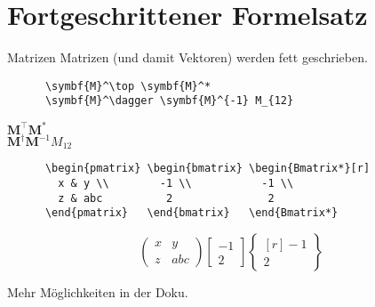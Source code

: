 \section{Fortgeschrittener Formelsatz}

\begin{frame}[fragile]{
  Matrizen
  \hfill{}
}
  Matrizen (und damit Vektoren) werden fett geschrieben.
  \begin{CodeExample}{0.70}
    \begin{lstlisting}
      \symbf{M}^\top \symbf{M}^*
      \symbf{M}^\dagger \symbf{M}^{-1} M_{12}
    \end{lstlisting}
  \CodeResult
    $\symbf{M}^\top \symbf{M}^*$ \\
    $\symbf{M}^\dagger \symbf{M}^{-1} M_{12}$
  \end{CodeExample}

  \fontsize{8}{6}
  \begin{CodeExample}{0.70}
    \begin{lstlisting}
      \begin{pmatrix} \begin{bmatrix} \begin{Bmatrix*}[r]
        x & y \\        -1 \\           -1 \\
        z & abc          2               2
      \end{pmatrix}   \end{bmatrix}   \end{Bmatrix*}
    \end{lstlisting}
  \CodeResult
    \removedisplayskip
    \begin{equation*}
      \begin{pmatrix}
        x & y \\
        z & abc
      \end{pmatrix}
      \begin{bmatrix}
        -1 \\
         2
      \end{bmatrix}
      \begin{Bmatrix*}[r]
        -1 \\
         2
      \end{Bmatrix*}
    \end{equation*}
  \end{CodeExample}

  \vspace{1em}
  Mehr Möglichkeiten in der Doku.
\end{frame}

